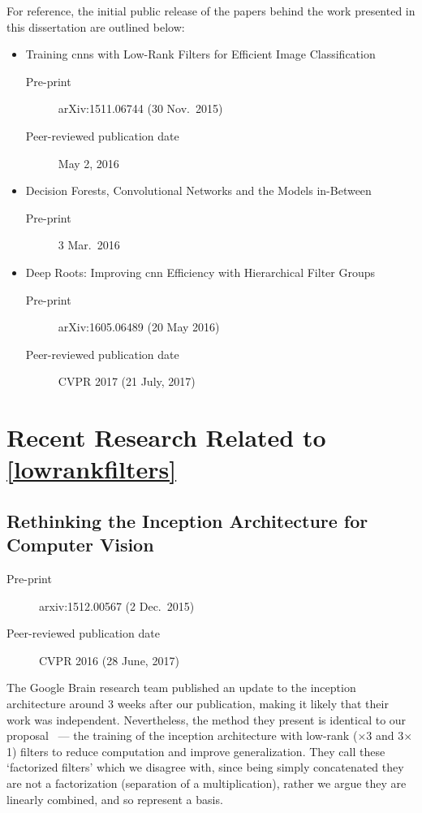 \documentclass[thesis]{subfiles}
\begin{document}
For reference, the initial public release of the papers behind the work presented in this dissertation are outlined below:
\begin{itemize}
    \item Training \glspl{cnn} with Low-Rank Filters for Efficient Image Classification~\citep{Ioannou2016}
    \begin{description}
        \item[Pre-print] arXiv:1511.06744 (30 Nov.\ 2015)
        \item[Peer-reviewed publication date] May 2, 2016
    \end{description}
    \item Decision Forests, Convolutional Networks and the Models in-Between~\citep{Ioannou2015}
    \begin{description}
        \item[Pre-print] 3 Mar.\ 2016
    \end{description}
    \item Deep Roots: Improving \gls{cnn} Efficiency with Hierarchical Filter Groups~\citep{ioannou2016e}
    \begin{description}
        \item[Pre-print] arXiv:1605.06489 (20 May 2016)
        \item[Peer-reviewed publication date] CVPR 2017 (21 July, 2017)
    \end{description}
\end{itemize}

\section{Recent Research Related to \cref{lowrankfilters}}
\subsection*{Rethinking the Inception Architecture for Computer Vision}
\begin{description}
    \item[Pre-print] arxiv:1512.00567 (2 Dec.\ 2015)
    \item[Peer-reviewed publication date] CVPR 2016 (28 June, 2017)
\end{description}
The Google Brain research team published an update to the \Gls{inception} architecture around 3 weeks after our publication, making it likely that their work was independent. Nevertheless, the method they present is identical to our proposal~\citep{Ioannou2016} --- the training of the \Gls{inception} architecture with low-rank ($\times$3 and 3$\times$1) filters to reduce computation and improve generalization. They call these `factorized filters' which we disagree with, since being simply concatenated they are not a factorization (\ie separation of a multiplication), rather we argue they are linearly combined, and so represent a basis.
\end{document}
